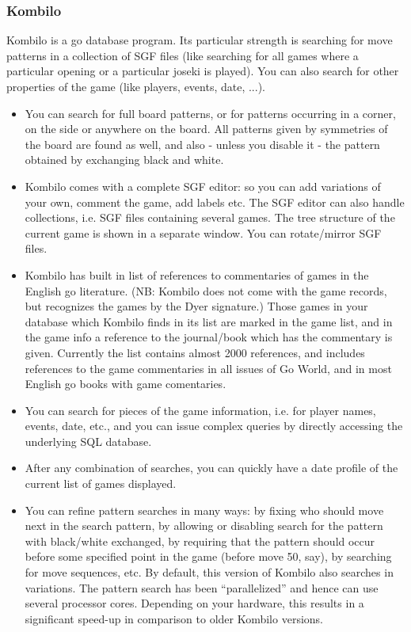 \subsubsection{Kombilo}
Kombilo is a go database program. Its particular strength is searching for move patterns in a collection of SGF files (like searching for all games where a particular opening or a particular joseki is played). You can also search for other properties of the game (like players, events, date, ...).

\begin{itemize}
	\item You can search for full board patterns, or for patterns occurring in a corner, on the side or anywhere on the board. All patterns given by symmetries of the board are found as well, and also - unless you disable it - the pattern obtained by exchanging black and white.
	\item Kombilo comes with a complete SGF editor: so you can add variations of your own, comment the game, add labels etc. The SGF editor can also handle collections, i.e. SGF files containing several games. The tree structure of the current game is shown in a separate window. You can rotate/mirror SGF files.
	\item Kombilo has built in list of references to commentaries of games in the English go literature. (NB: Kombilo does not come with the game records, but recognizes the games by the Dyer signature.) Those games in your database which Kombilo finds in its list are marked in the game list, and in the game info a reference to the journal/book which has the commentary is given. Currently the list contains almost 2000 references, and includes references to the game commentaries in all issues of Go World, and in most English go books with game comentaries.
	\item You can search for pieces of the game information, i.e. for player names, events, date, etc., and you can issue complex queries by directly accessing the underlying SQL database.
	\item After any combination of searches, you can quickly have a date profile of the current list of games displayed.
	\item You can refine pattern searches in many ways: by fixing who should move next in the search pattern, by allowing or disabling search for the pattern with black/white exchanged, by requiring that the pattern should occur before some specified point in the game (before move 50, say), by searching for move sequences, etc. By default, this version of Kombilo also searches in variations. The pattern search has been “parallelized” and hence can use several processor cores. Depending on your hardware, this results in a significant speed-up in comparison to older Kombilo versions.
\end{itemize}
